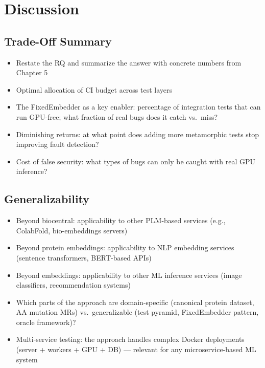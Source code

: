 
\chapter{Discussion}\label{chapter:discussion}


\section{Trade-Off Summary}\label{sec:tradeoff-summary}
\begin{itemize}
  \item Restate the RQ and summarize the answer with concrete numbers from Chapter 5
  \item Optimal allocation of CI budget across test layers
  \item The FixedEmbedder as a key enabler: percentage of integration tests that can run GPU-free; what fraction of real bugs does it catch vs.\ miss?
  \item Diminishing returns: at what point does adding more metamorphic tests stop improving fault detection?
  \item Cost of false security: what types of bugs can only be caught with real GPU inference?
\end{itemize}

\section{Generalizability}\label{sec:generalizability}
\begin{itemize}
  \item Beyond biocentral: applicability to other PLM-based services (e.g., ColabFold, bio-embeddings servers)
  \item Beyond protein embeddings: applicability to NLP embedding services (sentence transformers, BERT-based APIs)
  \item Beyond embeddings: applicability to other ML inference services (image classifiers, recommendation systems)
  \item Which parts of the approach are domain-specific (canonical protein dataset, AA mutation MRs) vs.\ generalizable (test pyramid, FixedEmbedder pattern, oracle framework)?
  \item Multi-service testing: the approach handles complex Docker deployments (server + workers + GPU + DB) --- relevant for any microservice-based ML system
\end{itemize}

